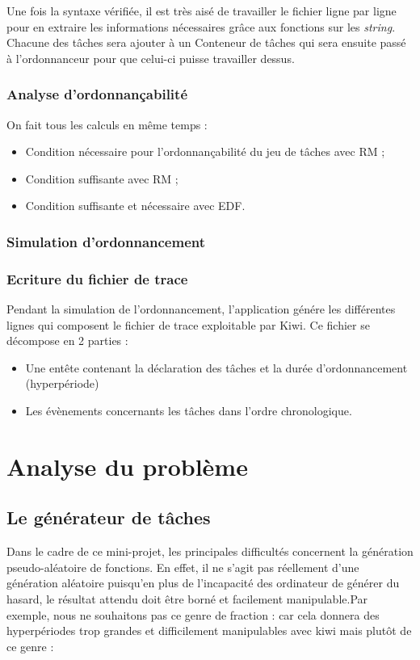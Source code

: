 				Une fois la syntaxe vérifiée, il est très aisé de travailler le fichier ligne par ligne pour en extraire les informations nécessaires grâce aux fonctions sur les \emph{string}. Chacune des tâches sera ajouter à un Conteneur de tâches qui sera ensuite passé à l'ordonnanceur pour que celui-ci puisse travailler dessus.
			
			\subsection{Analyse d'ordonnançabilité}
				On fait tous les calculs en même temps :
				\begin{itemize}
					\item Condition nécessaire pour l'ordonnançabilité du jeu de tâches avec RM ;
					\item Condition suffisante avec RM ;
					\item Condition suffisante et nécessaire avec EDF.
				\end{itemize}
		
			\subsection{Simulation d'ordonnancement}
			
			\subsection{Ecriture du fichier de trace}
				Pendant la simulation de l'ordonnancement, l'application génére les différentes lignes qui composent le fichier de trace exploitable par Kiwi. Ce fichier se décompose en 2 parties :
					\begin{itemize}
						\item Une entête contenant la déclaration des tâches et la durée d'ordonnancement (hyperpériode)
						\item Les évènements concernants les tâches dans l'ordre chronologique.
					\end{itemize}

	
	
	
\chapter{Analyse du problème}
	\section{Le générateur de tâches}
		Dans le cadre de ce mini-projet, les principales difficultés concernent la génération pseudo-aléatoire de fonctions. En effet, il ne s'agit pas réellement d'une génération aléatoire puisqu'en plus de l'incapacité des ordinateur de générer du hasard, le résultat attendu doit être borné et facilement manipulable.Par exemple, nous ne souhaitons pas ce genre de fraction :
 car cela donnera des hyperpériodes trop grandes et difficilement manipulables avec kiwi mais plutôt de ce genre :

